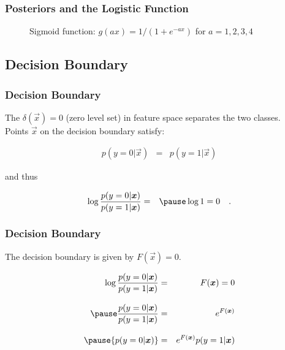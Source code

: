 \begin{frame}
  \frametitle{Posteriors and the Logistic Function \cont}
 
  \begin{figure}
    \caption{Sigmoid function: $g(ax)=1/(1+e^{-ax})$ for $a=1,2,3,4$}
    \label{f:sigmoid}
  \end{figure}
\end{frame}




\subsection{Decision Boundary}

\begin{frame}
  \frametitle{Decision Boundary}

  The  $\delta(\vec x)=0$ (zero level set) in feature space separates the two classes. \\[.3cm]
  Points $\vec x$ on the decision boundary satisfy:
 
  \begin{eqnarray*}
    {p(y=0|\vec{x})}&=& {p(y=1|\vec x)}
  \end{eqnarray*}
 
  and thus
 
  \begin{eqnarray*}
    \log \frac{p(y=0|\vec{x})}{p(y=1|\vec x)} &=& \pause \log 1 = 0 \quad.
  \end{eqnarray*}
\end{frame}


\begin{frame}
  \frametitle{Decision Boundary \cont}
 
  \begin{lemma}
    The decision boundary is given by $F(\vec x) = 0$.
  \end{lemma}
  \pspread
 
%
  \begin{eqnarray*}
    \log \frac{p(y=0|\vec{x})}{p(y=1|\vec x)} &=& F(\vec x) = 0\\[.3cm] \pause
    \frac{p(y=0|\vec{x})}{p(y=1|\vec x)} &=& e^{F(\vec x)} \\[.3cm] \pause
    {p(y=0|\vec{x})}&=& e^{F(\vec x)} {p(y=1|\vec x)} \\[.3cm]
  \end{eqnarray*} 
\end{frame}


